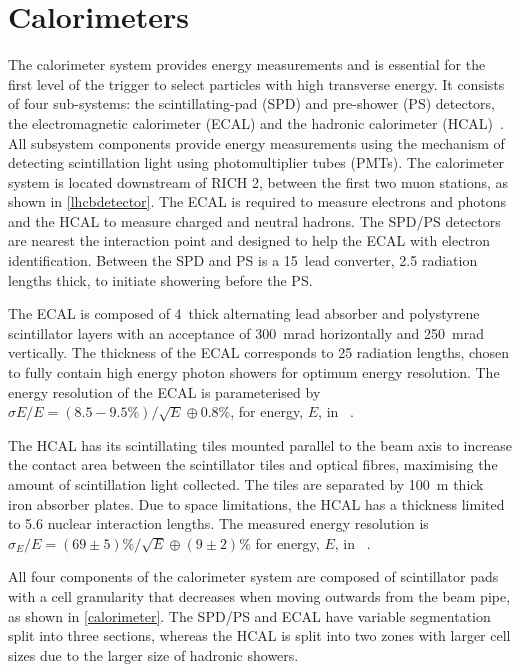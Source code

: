 \section{Calorimeters}

The \lhcb calorimeter system provides energy measurements and is essential for the first level of the trigger to select particles with high transverse energy. It consists of four sub-systems: the scintillating-pad (SPD) and pre-shower (PS) detectors, the electromagnetic calorimeter (ECAL) and the hadronic calorimeter (HCAL)~\cite{LHCb-DP-2013-004}. All subsystem components provide energy measurements using the mechanism of detecting scintillation light using photomultiplier tubes (PMTs). The calorimeter system is located downstream of RICH 2, between the first two muon stations, as shown in \fig\ref{lhcbdetector}. The ECAL is required to measure electrons and photons and the HCAL to measure charged and neutral hadrons.  The SPD/PS detectors are nearest the interaction point and designed to help the ECAL with electron identification. Between the SPD and PS is a 15~\mm lead converter, 2.5 radiation lengths thick, to initiate showering before the PS. 

The ECAL is composed of 4~\mm thick alternating lead absorber and polystyrene scintillator layers with an acceptance of 300~mrad horizontally and 250~mrad vertically. The thickness of the ECAL corresponds to 25 radiation lengths, chosen to fully contain high energy photon showers for optimum energy resolution. The energy resolution of the ECAL is parameterised by $\sigma E/E = (8.5-9.5\%)/\sqrt{E} \oplus 0.8\%$, for energy, $E$, in \gev~\cite{calo_latest}.

The HCAL has its scintillating tiles mounted parallel to the beam axis to increase the contact area between the scintillator tiles and optical fibres, maximising the amount of scintillation light collected. The tiles are separated by 100~m thick iron absorber plates. Due to space limitations, the HCAL has a thickness limited to 5.6 nuclear interaction lengths. The measured energy resolution is $\sigma_E/E = (69 \pm 5)\%/\sqrt{E} \oplus (9 \pm 2)\%$ for energy, $E$, in \gev~\cite{calo_latest}.

All four components of the calorimeter system are composed of scintillator pads with a cell granularity that decreases when moving outwards from the beam pipe, as shown in \fig\ref{calorimeter}. The SPD/PS and ECAL have variable segmentation split into three sections, whereas the HCAL is split into two zones with larger cell sizes due to the larger size of hadronic showers.

